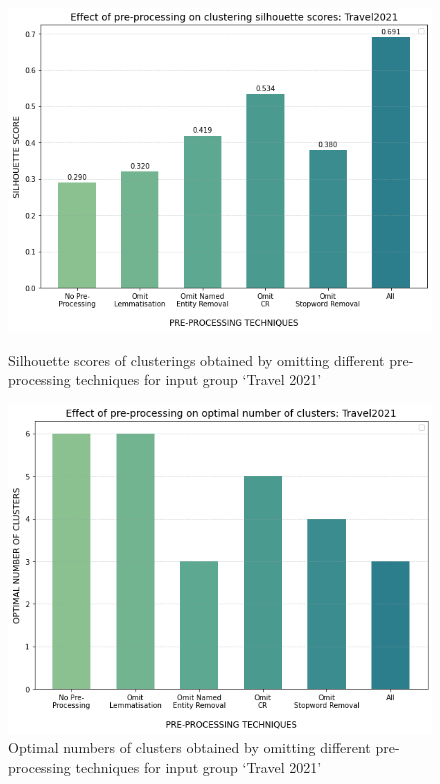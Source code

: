 \begin{figure}[H]
\centering
  \begin{minipage}[t]{.49\linewidth}
    \centering
    \includegraphics[width=\linewidth]{images/eval/effect_preprocessing.png}
    \caption{Silhouette scores of clusterings obtained by omitting different pre-processing techniques for input group `Travel 2021'}
    
    \label{fig:pre-processing_sil}
  \end{minipage}
  \hfill
  \begin{minipage}[t]{.49\textwidth}
    \centering
    \includegraphics[width=\linewidth]{images/eval/preprocessing_cluster_no.png}
    \caption{Optimal numbers of clusters obtained by omitting different pre-processing techniques for input group `Travel 2021'}
     \label{fig:pre-processing_cluster_no}
  \end{minipage}
\end{figure}

